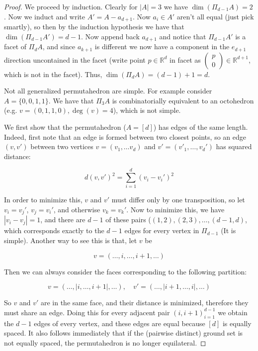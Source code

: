 \documentclass{article}
\begin{document}
\begin{enumerate}
\begin{proof}
We proceed by induction. Clearly for $|A| = 3$ we have $\dim(\Pi_{d-1}A) = 2$. Now we induct and write $A' = A - a_{d+1}$. Now $a_i \in A'$ aren't all equal (just pick smartly), so then by the induction hypothesis we have that $\dim(\Pi_{d-1}A') = d-1$. Now append back $a_{d+1}$ and notice that $\Pi_{d-1}A'$ is a facet of $\Pi_dA$, and since $a_{k+1}$ is different we now have a component in the $e_{d+1}$ direction uncontained in the facet (write point $p \in \mathbb{R}^d$ in facet as $\begin{pmatrix}
    p \\
    0
\end{pmatrix} \in \mathbb{R}^{d+1}$, which is not in the facet). Thus, $\dim(\Pi_{d}A) = (d-1)+1 = d$.

Not all generalized permutahedron are simple. For example consider $A = \{0, 0, 1, 1\}$. We have that $\Pi_3A$ is combinatorially equivalent to an octohedron (e.g. $v = (0,1,1,0),\deg(v) = 4$), which is not simple.

\smallskip

We first show that the permutahedron ($A = [d]$) has edges of the same length. Indeed, first note that an edge is formed between two closest points, so an edge $(v,v')$ between two vertices $v = (v_1, \ldots v_d)$ and $v' = (v'_1, \dots, v_d')$ has squared distance:

\[d(v, v')^2 = \sum_{i=1}^d (v_i - v_i')^2\]

In order to minimize this, $v$ and $v'$ must differ only by one transposition, so let $v_i = v_j'$, $v_j = v_i'$, and otherwise $v_k = v_k'$. Now to minimize this, we have $|v_i - v_j| = 1$, and there are  $d-1$ of these pairs ($(1,2), (2,3), \ldots, (d-1, d)$, which corresponds exactly to the $d-1$ edges for every vertex in $\Pi_{d-1}$ (It is simple). Another way to see this is that, let $v$ be

\[v = (\ldots, i, \ldots, i+1, \ldots) \]

Then we can always consider the faces corresponding to the following partition:

\[v = (\ldots, | i, \ldots, i+1 |, \ldots), \quad v' = (\ldots, | i+1, \ldots, i|, \ldots)\]

So $v$ and $v'$ are in the same face, and their distance is minimized, therefore they must share an edge. Doing this for every adjacent pair $(i, i+1)_{i=1}^{d-1}$ we obtain the $d-1$ edges of every vertex, and these edges are equal because $[d]$ is equally spaced. It also follows immediately that if the (pairwise distinct) ground set is not equally spaced, the permutahedron is no longer equilateral.


\end{proof}
\end{enumerate}
\end{document}
